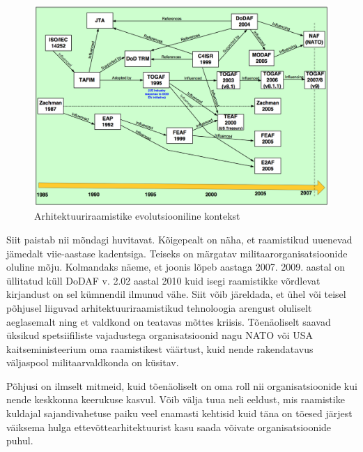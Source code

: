 \documentclass{tufte-book}
\begin{document}
\begin{figure}%
	\begin{center}
		\includegraphics[width=\linewidth]{eaevolution.png}
		\caption{Arhitektuuriraamistike evolutsiooniline kontekst}
		\label{fig:architecture:EA}
	\end{center}
\end{figure}

Siit paistab nii mõndagi huvitavat. Kõigepealt on näha, et raamistikud uuenevad jämedalt viie-aastase kadentsiga. Teiseks on märgatav militaarorganisatsioonide oluline mõju. Kolmandaks näeme, et joonis lõpeb aastaga 2007. 2009. aastal on üllitatud küll DoDAF v. 2.02 aastal 2010 kuid isegi raamistikke võrdlevat kirjandust on sel kümnendil ilmunud vähe. Siit võib järeldada, et ühel või teisel põhjusel liiguvad arhitektuuriraamistikud tehnoloogia arengust oluliselt aeglasemalt ning et valdkond on teatavas mõttes kriisis. Tõenäoliselt saavad üksikud spetsiifiliste vajadustega organisatsioonid nagu NATO või USA kaitseministeerium oma raamistikest väärtust, kuid nende rakendatavus väljaspool militaarvaldkonda on küsitav. 

Põhjusi on ilmselt mitmeid, kuid tõenäoliselt on oma roll nii organisatsioonide kui nende keskkonna keerukuse kasvul. Võib välja tuua neli eeldust, mis raamistike kuldajal sajandivahetuse paiku veel enamasti kehtisid kuid täna on tõesed järjest väiksema hulga ettevõttearhitektuurist kasu saada võivate organisatsioonide puhul.
\end{document}
